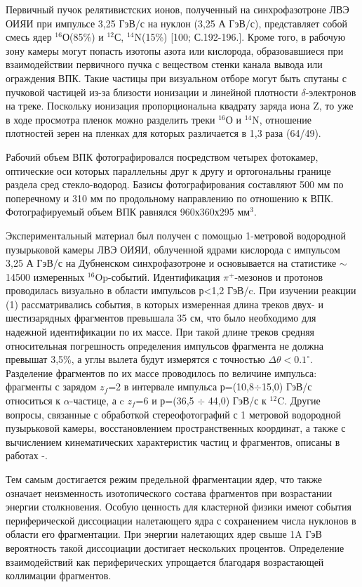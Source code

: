 \documentclass[fontsize=14pt]{scrreport}
\begin{document}
Первичный пучок релятивистских ионов, полученный на синхрофазотроне ЛВЭ ОИЯИ при импульсе 3,25 ГэВ/с на нуклон (3,25 А ГэВ/с), представляет собой смесь ядер $^{16}$О(85\%) и $^{12}$С, $^{14}$N(15\%) [100; С.192-196.]. Кроме того, в рабочую зону камеры могут попасть изотопы азота или кислорода, образовавшиеся при взаимодействии первичного пучка с веществом стенки канала вывода или ограждения ВПК. Такие частицы при визуальном отборе могут быть спутаны с пучковой частицей из-за близости
ионизации и линейной плотности $\delta$-электронов на треке. Поскольку ионизация пропорциональна квадрату заряда иона Z, то уже в ходе просмотра пленок можно разделить треки $^{16}$О и $^{14}$N, отношение плотностей зерен на пленках для которых различается в 1,3 раза (64/49). 

Рабочий объем ВПК  фотографировался посредством четырех фотокамер, оптические оси которых  параллельны друг к другу  и  ортогональны границе   раздела   сред стекло-водород. Базисы фотографирования составляют 500 мм по поперечному и 310 мм по продольному направлению по отношению к ВПК. Фотографируемый объем ВПК равнялся 960х360х295 мм$^{3}$.


Экспериментальный материал был получен с помощью 1-метровой водородной пузырьковой камеры ЛВЭ ОИЯИ, облученной ядрами кислорода с импульсом 3,25 А ГэВ/с на Дубненском синхрофазотроне и основывается на статистике $\sim$14500 измеренных $^{16}$Op-событий. Идентификация $\pi^{+}$-мезонов и протонов проводилась визуально в области импульсов р<1,2 ГэВ/c. При изучении реакции (1)  рассматривались события, в которых измеренная длина треков двух- и шестизарядных фрагментов превышала 35 см, что было необходимо для  надежной идентификации по их массе. При такой длине треков средняя относительная погрешность определения импульсов фрагмента не должна превышат 3,5\%, а углы вылета будут измерятся с точностью $\Delta\theta<0.1^{\circ}$. Разделение фрагментов по их массе проводилось по величине  импульса: фрагменты с зарядом $z_{f}$=2 в интервале импульса р=(10,8$\div$15,0) ГэВ/с относиться к $\alpha$-частице, а c $z_{f}$=6 и р=(36,5 $\div$ 44,0) ГэВ/с  к $^{12}$C. Другие вопросы, связанные с обработкой стереофотографий с 1 метровой водородной пузырьковой камеры, восстановлением пространственных координат, а также с вычислением кинематических характеристик частиц и фрагментов, описаны в работах \cite{4}-\cite{7}.

 Тем самым достигается режим предельной фрагментации ядер, что также означает неизменность изотопического состава фрагментов при возрастании энергии столкновения. Особую ценность для кластерной физики имеют события периферической диссоциации налетающего ядра с сохранением числа нуклонов в области его фрагментации. При энергии налетающих ядер свыше 1A ГэВ вероятность такой диссоциации достигает нескольких процентов. Определение взаимодействий как периферических упрощается благодаря возрастающей коллимации фрагментов. 
\end{document}
